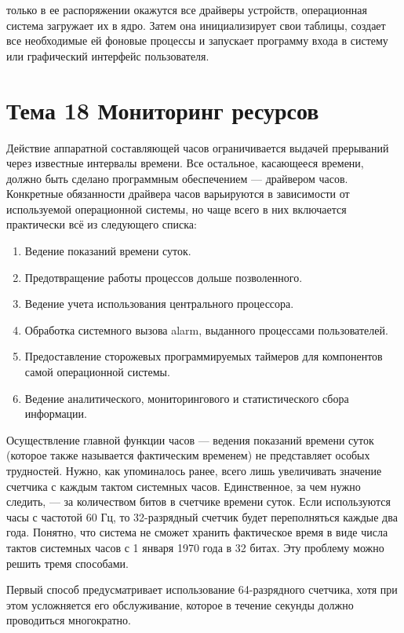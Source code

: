 только в ее распоряжении окажутся все драйверы устройств, операционная система загружает их в ядро. Затем она инициализирует свои таблицы, создает все необходимые ей фоновые процессы и запускает программу входа в систему или графический интерфейс пользователя.

\newpage 
\chapter{Тема 18 Мониторинг ресурсов}

Действие аппаратной составляющей часов ограничивается выдачей прерываний через
известные интервалы времени. Все остальное, касающееся времени, должно быть сделано программным обеспечением — драйвером часов. Конкретные обязанности драйвера
часов варьируются в зависимости от используемой операционной системы, но чаще
всего в них включается практически всё из следующего списка:

\begin{enumerate}
  \item Ведение показаний времени суток.
  \item Предотвращение работы процессов дольше позволенного.
  \item Ведение учета использования центрального процессора.
  \item Обработка системного вызова alarm, выданного процессами пользователей.
  \item Предоставление сторожевых программируемых таймеров для компонентов самой операционной системы.
  \item Ведение аналитического, мониторингового и статистического сбора информации.
\end{enumerate}

Осуществление главной функции часов — ведения показаний времени суток (которое
также называется фактическим временем) не представляет особых трудностей. Нужно,
как упоминалось ранее, всего лишь увеличивать значение счетчика с каждым тактом
системных часов. Единственное, за чем нужно следить, — за количеством битов в счетчике времени суток. Если используются часы с частотой 60 Гц, то 32-разрядный счетчик
будет переполняться каждые два года. Понятно, что система не сможет хранить фактическое время в виде числа тактов системных часов с 1 января 1970 года в 32 битах.
Эту проблему можно решить тремя способами.

Первый способ предусматривает использование 64-разрядного счетчика, хотя при этом усложняется его обслуживание,
которое в течение секунды должно проводиться многократно. 

